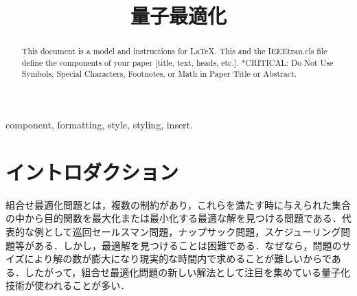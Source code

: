 \documentclass[conference]{IEEEtran}
\begin{document}
\title{量子最適化}

\author{
\and
{}
\and
{}
}

\maketitle

\begin{abstract}
This document is a model and instructions for \LaTeX.
This and the IEEEtran.cls file define the components of your paper [title, text, heads, etc.]. *CRITICAL: Do Not Use Symbols, Special Characters, Footnotes, 
or Math in Paper Title or Abstract.
\end{abstract}

\begin{IEEEkeywords}
component, formatting, style, styling, insert.
\end{IEEEkeywords}

\section{イントロダクション}
組合せ最適化問題とは，複数の制約があり，これらを満たす時に与えられた集合の中から目的関数を最大化または最小化する最適な解を見つける問題である．代表的な例として巡回セールスマン問題，ナップサック問題，スケジューリング問題等がある．しかし，最適解を見つけることは困難である．なぜなら，問題のサイズにより解の数が膨大になり現実的な時間内で求めることが難しいからである．したがって，組合せ最適化問題の新しい解法として注目を集めている量子化技術が使われることが多い．
\end{document}
